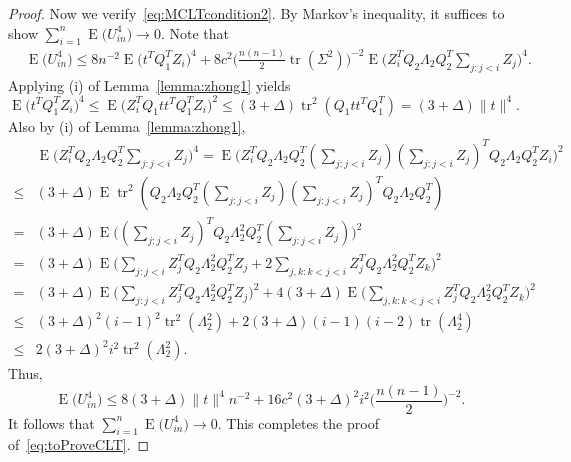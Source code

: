 \documentclass[3p]{elsarticle}
\DeclareMathOperator{\mytr}{tr}
\DeclareMathOperator{\myE}{E}
\theoremstyle{plain}
\theoremstyle{definition}
\theoremstyle{remark}
\begin{document}
\begin{proof}
     Now we verify~\eqref{eq:MCLTcondition2}.
     By Markov's inequality, it suffices to show $\sum_{i=1}^n \myE\big(U_{in}^4\big)\to 0$.
     Note that
     $$
     \begin{aligned}
         &\myE\big(U_{in}^4\big)
         \leq
         8n^{-2}\myE \big(t^T Q_1^T Z_i\big)^4+
         8c^2  
         \big(\frac{n(n-1)}{2} \mytr(\Sigma^2)\big)^{-2}
         \myE\big( Z_i^T Q_2 \Lambda_2 Q_2^T \sum_{j:j<i}Z_j\big)^4.
     \end{aligned}
     $$
    Applying (i) of Lemma~\ref{lemma:zhong1} yields
    $$
\myE \big(t^T Q_1^T Z_i\big)^4\leq
         \myE \big( Z_i^T Q_1 t t^T Q_1^T Z_i\big)^2
         \leq (3+\Delta)\mytr^2 (Q_1 t t^T Q_1^T)
         = (3+\Delta) \|t\|^4.
    $$
    Also by (i) of Lemma~\ref{lemma:zhong1},
    $$
    \begin{aligned}
        &
         \myE\big( Z_i^T Q_2 \Lambda_2 Q_2^T \sum_{j:j<i}Z_j\big)^4
         =
        \myE\big( Z_i^T Q_2 \Lambda_2 Q_2^T (\sum_{j:j<i}Z_j)(\sum_{j:j<i}Z_j)^T Q_2 \Lambda_2 Q_2^T Z_i\big)^2
        \\
        \leq &
        (3+\Delta)\myE \mytr^2 (Q_2 \Lambda_2 Q_2^T (\sum_{j:j<i}Z_j)(\sum_{j:j<i}Z_j)^T Q_2 \Lambda_2 Q_2^T)
        \\
        = &
        (3+\Delta)\myE  \Big((\sum_{j:j<i}Z_j)^T Q_2 \Lambda_2^2 Q_2^T (\sum_{j:j<i}Z_j)\Big)^2
        \\
        = &
        (3+\Delta)\myE  \Big(\sum_{j:j<i}Z_j^T Q_2 \Lambda_2^2 Q_2^T Z_j+2\sum_{j,k:k<j<i}Z_j^T Q_2 \Lambda_2^2 Q_2^T Z_k\Big)^2
        \\
        = &
        (3+\Delta)\myE  \Big(\sum_{j:j<i}Z_j^T Q_2 \Lambda_2^2 Q_2^T Z_j \Big)^2+4(3+\Delta)\myE \Big(\sum_{j,k:k<j<i}Z_j^T Q_2 \Lambda_2^2 Q_2^T Z_k\Big)^2
        \\
        \leq &
        (3+\Delta)^2 (i-1)^2 \mytr^2 (\Lambda_2^2)  +2(3+\Delta)(i-1)(i-2)\mytr(\Lambda_2^4)
        \\
        \leq &
        2(3+\Delta)^2 i^2 \mytr^2 (\Lambda_2^2).
    \end{aligned}
    $$
    Thus,
     $$
         \myE\big(U_{in}^4\big)
         \leq 8 (3+\Delta)\|t\|^4 n^{-2}+
         16 c^2 (3+\Delta)^2 i^2 \big(\frac{n(n-1)}{2}\big)^{-2}.
     $$
     It follows that
     $
         \sum_{i=1}^n \myE\big(U_{in}^4\big)
        \to 0.
     $
     This completes the proof of~\eqref{eq:toProveCLT}.

    


\end{proof}
\end{document}

